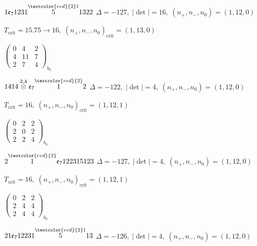 \documentclass[10pt]{article}
\begin{document}
\smallskip

$1\mathfrak{e}_71231\overset{\textcolor{red}{2}1}{5}1322$ \quad $\Delta=-127,\; |\det|=16,\; (n_+,n_-,n_0)=(1,12,0)$

\hspace{1em}$T_{\text{crit}}=15.75 \to 16,\; (n_+,n_-,n_0)_{\text{crit}}=(1,13,0)$

\hspace{2em}$\left(\begin{smallmatrix}0 & 4 & 2 \\ 4 & 11 & 7 \\ 2 & 7 & 4\end{smallmatrix}\right)_{\!b_0}$

\smallskip

$1414\overset{2,4}{\otimes}\mathfrak{e}_7\overset{\textcolor{red}{2}}{1}2$ \quad $\Delta=-122,\; |\det|=4,\; (n_+,n_-,n_0)=(1,12,0)$

\hspace{1em}$T_{\text{crit}}=16,\; (n_+,n_-,n_0)_{\text{crit}}=(1,12,1)$

\hspace{2em}$\left(\begin{smallmatrix}0 & 2 & 2 \\ 2 & 0 & 2 \\ 2 & 2 & 4\end{smallmatrix}\right)_{\!b_0}$

\smallskip

$2\overset{\textcolor{red}{2}}{1}\mathfrak{e}_7122315123$ \quad $\Delta=-127,\; |\det|=4,\; (n_+,n_-,n_0)=(1,12,0)$

\hspace{1em}$T_{\text{crit}}=16,\; (n_+,n_-,n_0)_{\text{crit}}=(1,12,1)$

\hspace{2em}$\left(\begin{smallmatrix}0 & 2 & 2 \\ 2 & 4 & 4 \\ 2 & 4 & 4\end{smallmatrix}\right)_{\!b_0}$

\smallskip

$21\mathfrak{e}_712231\overset{\textcolor{red}{2}1}{5}13$ \quad $\Delta=-126,\; |\det|=4,\; (n_+,n_-,n_0)=(1,12,0)$
\end{document}
